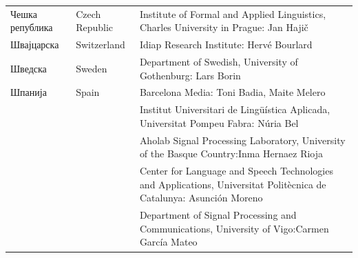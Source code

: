 {\begin{longtable}{llp{114mm}}
  Чешка република & \textcolor{grey1}{Czech Republic} & Institute of Formal and Applied Linguistics, Charles University in Prague: Jan Hajič \\ \addlinespace
  Швајцарска & \textcolor{grey1}{Switzerland} & Idiap Research Institute: Hervé Bourlard \\ \addlinespace 
  Шведска & \textcolor{grey1}{Sweden} & Department of Swedish, University of Gothenburg: Lars Borin \\ \addlinespace 
  Шпанија &  \textcolor{grey1}{Spain} & Barcelona Media: Toni Badia, Maite Melero \\ \addlinespace 
  & & Institut Universitari de Lingüística Aplicada, Universitat Pompeu Fabra: Núria Bel \\ \addlinespace 
  & & Aholab Signal Processing Laboratory, University of the Basque Country:\newline Inma Hernaez Rioja \\ \addlinespace 
  & & Center for Language and Speech Technologies and Applications, Universitat Politècnica de Catalunya:  Asunción Moreno \\ \addlinespace 
  & & Department of Signal Processing and Communications, University of Vigo:\newline Carmen García Mateo  
    
\end{longtable}
\normalsize

\renewcommand*{\figureformat}{}
\renewcommand*{\captionformat}{}

}
